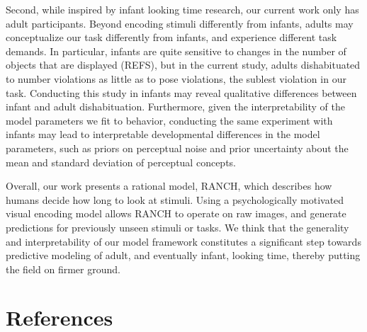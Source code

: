 \documentclass[10pt, letterpaper]{article}
\begin{document}
Second, while inspired by infant looking time research, our current work
only has adult participants. Beyond encoding stimuli differently from
infants, adults may conceptualize our task differently from infants, and
experience different task demands. In particular, infants are quite
sensitive to changes in the number of objects that are displayed (REFS),
but in the current study, adults dishabituated to number violations as
little as to pose violations, the sublest violation in our task.
Conducting this study in infants may reveal qualitative differences
between infant and adult dishabituation. Furthermore, given the
interpretability of the model parameters we fit to behavior, conducting
the same experiment with infants may lead to interpretable developmental
differences in the model parameters, such as priors on perceptual noise
and prior uncertainty about the mean and standard deviation of
perceptual concepts.

Overall, our work presents a rational model, RANCH, which describes how
humans decide how long to look at stimuli. Using a psychologically
motivated visual encoding model allows RANCH to operate on raw images,
and generate predictions for previously unseen stimuli or tasks. We
think that the generality and interpretability of our model framework
constitutes a significant step towards predictive modeling of adult, and
eventually infant, looking time, thereby putting the field on firmer
ground.

\hypertarget{references}{%
\section{References}\label{references}}

\setlength{\parindent}{-0.1in} 
\setlength{\leftskip}{0.125in}

\noindent
\end{document}

